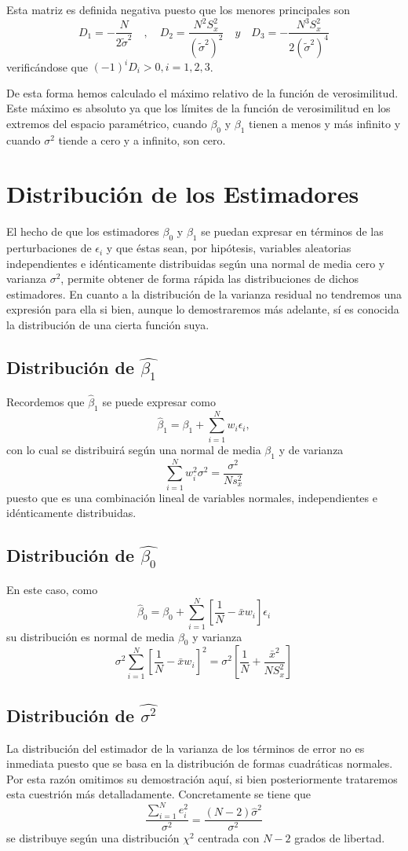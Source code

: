 \documentclass[10pt,a4paper]{book}
\begin{document}
Esta matriz es definida negativa puesto que los menores principales son $$D_1=-\dfrac{N}{2\tilde{\sigma}^2}\quad , \quad D_2=\dfrac{N^2S^2_x}{(\tilde{\sigma}^2)^2}\quad y\quad D_3=-\dfrac{N^3S^2_x}{2(\tilde{\sigma}^2)^4}$$ verificándose que $(-1)^iD_i>0,i=1,2,3$.

De esta forma hemos calculado el máximo relativo de la función de verosimilitud. Este máximo es absoluto ya que los límites de la función de verosimilitud en los extremos del espacio paramétrico, cuando $\beta_0$ y $\beta_1$ tienen a menos y más infinito y cuando $\sigma^2$ tiende a cero y a infinito, son cero.
	\section{Distribución de los Estimadores}
El hecho de que los estimadores $\beta_0$ y $\beta_1$ se puedan expresar en términos de las perturbaciones de $\epsilon_i$ y que éstas sean, por hipótesis, variables aleatorias independientes e idénticamente distribuidas según una normal de media cero y varianza $\sigma^2$, permite obtener de forma rápida las distribuciones de dichos estimadores. En cuanto a la distribución de la varianza residual no tendremos una expresión para ella si bien, aunque lo demostraremos más adelante, sí es conocida la distribución de una cierta función suya.
		\subsection{Distribución de $\widehat{\beta_1}$}
Recordemos que $\widehat{\beta}_1$ se puede expresar como $$\widehat{\beta}_1=\beta_1+\sum^N_{i=1}w_i\epsilon_i,$$ con lo cual se distribuirá según una normal de media $\beta_1$ y de varianza $$\sum^N_{i=1}w^2_i\sigma^2=\dfrac{\sigma^2}{Ns^2_x}$$ puesto que es una combinación lineal de variables normales, independientes e idénticamente distribuidas.
		\subsection{Distribución de $\widehat{\beta_0}$}
En este caso, como $$\widehat{\beta}_0=\beta_0+\sum^N_{i=1}\left[\dfrac{1}{N}-\bar{x}w_i\right]\epsilon_i$$ su distribución es normal de media $\beta_0$ y varianza $$\sigma^2\sum^N_{i=1}\left[\dfrac{1}{N}-\bar{x}w_i\right]^2=\sigma^2\left[\dfrac{1}{N}+\dfrac{\bar{x}^2}{NS^2_x}\right]$$
		\subsection{Distribución de $\widehat{\sigma^2}$}
La distribución del estimador de la varianza de los términos de error no es inmediata puesto que se basa en la distribución de formas cuadráticas normales. Por esta razón omitimos su demostración aquí, si bien posteriormente trataremos esta cuestrión más detalladamente. Concretamente se tiene que $$\dfrac{\sum^N_{i=1}e^2_i}{\sigma^2}=\dfrac{(N-2)\widehat{\sigma}^2}{\sigma^2}$$ se distribuye según una distribución $\chi^2$ centrada con $N-2$ grados de libertad.
\end{document}
